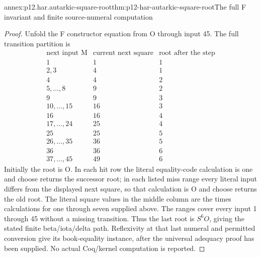\begin{annexitem}{annex:p12.har.autarkic-square-root}{thm:p12-har-autarkic-square-root}{The full F invariant and finite source-numeral computation}
\begin{proof}
Unfold the F constructor equation from O through input 45. The full
transition partition is
\[
\begin{array}{c|c|c}
 \text{next input M}&\text{current next square}&\text{root after the step}\\\hline
 1&1&1\\
 2,3&4&1\\
 4&4&2\\
 5,\ldots,8&9&2\\
 9&9&3\\
 10,\ldots,15&16&3\\
 16&16&4\\
 17,\ldots,24&25&4\\
 25&25&5\\
 26,\ldots,35&36&5\\
 36&36&6\\
 37,\ldots,45&49&6
\end{array}
\]
Initially the root is O. In each hit row the literal equality-code
calculation is one and choose returns the successor root; in each
listed miss range every literal input differs from the displayed
next square, so that calculation is O and choose returns the old root.
The literal square values in the middle column are the times
calculations for one through seven supplied above. The ranges cover
every input 1 through 45 without a missing transition. Thus the last
root is \(S^6O\), giving the stated finite beta/iota/delta path.
Reflexivity at that last numeral and permitted conversion give its
book-equality instance, after the universal adequacy proof has been
supplied. No actual Coq/kernel computation is reported.
\end{proof}
\end{annexitem}

